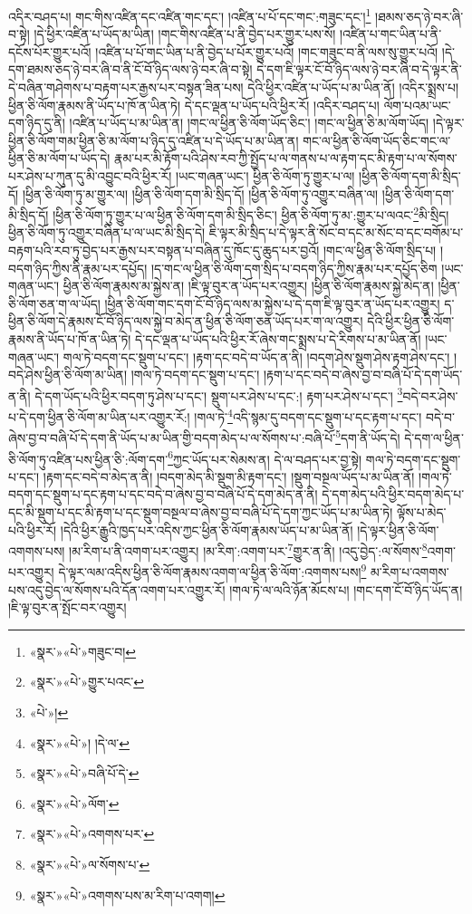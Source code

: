 འདིར་བཤད་པ། གང་གིས་འཛིན་དང་འཛིན་གང་དང་། །འཛིན་པ་པོ་དང་གང་:གཟུང་དང་།\footnote{«སྣར་»«པེ་»གཟུང་བ།} །ཐམས་ཅད་ཉེ་བར་ཞི་བ་སྟེ། །དེ་ཕྱིར་འཛིན་པ་ཡོད་མ་ཡིན། །གང་གིས་འཛིན་པ་ནི་བྱེད་པར་གྱུར་པས་སོ། །འཛིན་པ་གང་ཡིན་པ་ནི་དངོས་པོར་གྱུར་པའོ། །འཛིན་པ་པོ་གང་ཡིན་པ་ནི་བྱེད་པ་པོར་གྱུར་པའོ། །གང་གཟུང་བ་ནི་ལས་སུ་གྱུར་པའོ། །དེ་དག་ཐམས་ཅད་ཉེ་བར་ཞི་བ་ནི་ངོ་བོ་ཉིད་ལས་ཉེ་བར་ཞི་བ་སྟེ། དེ་དག་ཇི་ལྟར་ངོ་བོ་ཉིད་ལས་ཉེ་བར་ཞི་བ་དེ་ལྟར་ནི་དེ་བཞིན་གཤེགས་པ་བརྟག་པར་རྒྱས་པར་བསྟན་ཟིན་པས། དེའི་ཕྱིར་འཛིན་པ་ཡོད་པ་མ་ཡིན་ནོ། །འདིར་སྨྲས་པ། ཕྱིན་ཅི་ལོག་རྣམས་ནི་ཡོད་པ་ཁོ་ན་ཡིན་ཏེ། དེ་དང་ལྡན་པ་ཡོད་པའི་ཕྱིར་རོ། །འདིར་བཤད་པ། ལོག་པའམ་ཡང་དག་ཉིད་དུ་ནི། །འཛིན་པ་ཡོད་པ་མ་ཡིན་ན། །གང་ལ་ཕྱིན་ཅི་ལོག་ཡོད་ཅིང་། །གང་ལ་ཕྱིན་ཅི་མ་ལོག་ཡོད། །དེ་ལྟར་ཕྱིན་ཅི་ལོག་གམ་ཕྱིན་ཅི་མ་ལོག་པ་ཉིད་དུ་འཛིན་པ་དེ་ཡོད་པ་མ་ཡིན་ན། གང་ལ་ཕྱིན་ཅི་ལོག་ཡོད་ཅིང་གང་ལ་ཕྱིན་ཅི་མ་ལོག་པ་ཡོད་དེ། རྣམ་པར་མི་རྟོག་པའི་ཤེས་རབ་ཀྱི་སྤྱོད་པ་ལ་གནས་པ་ལ་རྟག་དང་མི་རྟག་པ་ལ་སོགས་པར་ཤེས་པ་ཀུན་དུ་མི་འབྱུང་བའི་ཕྱིར་རོ། །ཡང་གཞན་ཡང་། ཕྱིན་ཅི་ལོག་ཏུ་གྱུར་པ་ལ། །ཕྱིན་ཅི་ལོག་དག་མི་སྲིད་དོ། །ཕྱིན་ཅི་ལོག་ཏུ་མ་གྱུར་ལ། །ཕྱིན་ཅི་ལོག་དག་མི་སྲིད་དོ། །ཕྱིན་ཅི་ལོག་ཏུ་འགྱུར་བཞིན་ལ། །ཕྱིན་ཅི་ལོག་དག་མི་སྲིད་དོ། །ཕྱིན་ཅི་ལོག་ཏུ་གྱུར་པ་ལ་ཕྱིན་ཅི་ལོག་དག་མི་སྲིད་ཅིང་། ཕྱིན་ཅི་ལོག་ཏུ་མ་:གྱུར་པ་ལའང་\footnote{«སྣར་»«པེ་»གྱུར་པའང་}མི་སྲིད། ཕྱིན་ཅི་ལོག་ཏུ་འགྱུར་བཞིན་པ་ལ་ཡང་མི་སྲིད་དེ། ཇི་ལྟར་མི་སྲིད་པ་དེ་ལྟར་ནི་སོང་བ་དང་མ་སོང་བ་དང་བགོམ་པ་བརྟག་པའི་རབ་ཏུ་བྱེད་པར་རྒྱས་པར་བསྟན་པ་བཞིན་དུ་ཁོང་དུ་ཆུད་པར་བྱའོ། །གང་ལ་ཕྱིན་ཅི་ལོག་སྲིད་པ། །བདག་ཉིད་ཀྱིས་ནི་རྣམ་པར་དཔྱོད། །ད་གང་ལ་ཕྱིན་ཅི་ལོག་དག་སྲིད་པ་བདག་ཉིད་ཀྱིས་རྣམ་པར་དཔྱོད་ཅིག །ཡང་གཞན་ཡང་། ཕྱིན་ཅི་ལོག་རྣམས་མ་སྐྱེས་ན། །ཇི་ལྟ་བུར་ན་ཡོད་པར་འགྱུར། །ཕྱིན་ཅི་ལོག་རྣམས་སྐྱེ་མེད་ན། །ཕྱིན་ཅི་ལོག་ཅན་ག་ལ་ཡོད། །ཕྱིན་ཅི་ལོག་གང་དག་ངོ་བོ་ཉིད་ལས་མ་སྐྱེས་པ་དེ་དག་ཇི་ལྟ་བུར་ན་ཡོད་པར་འགྱུར། ད་ཕྱིན་ཅི་ལོག་དེ་རྣམས་ངོ་བོ་ཉིད་ལས་སྐྱེ་བ་མེད་ན་ཕྱིན་ཅི་ལོག་ཅན་ཡོད་པར་ག་ལ་འགྱུར། དེའི་ཕྱིར་ཕྱིན་ཅི་ལོག་རྣམས་ནི་ཡོད་པ་ཁོ་ན་ཡིན་ཏེ། དེ་དང་ལྡན་པ་ཡོད་པའི་ཕྱིར་རོ་ཞེས་གང་སྨྲས་པ་དེ་རིགས་པ་མ་ཡིན་ནོ། །ཡང་གཞན་ཡང་། གལ་ཏེ་བདག་དང་སྡུག་པ་དང་། །རྟག་དང་བདེ་བ་ཡོད་ན་ནི། །བདག་ཤེས་སྡུག་ཤེས་རྟག་ཤེས་དང་། །བདེ་ཤེས་ཕྱིན་ཅི་ལོག་མ་ཡིན། །གལ་ཏེ་བདག་དང་སྡུག་པ་དང་། །རྟག་པ་དང་བདེ་བ་ཞེས་བྱ་བ་བཞི་པོ་དེ་དག་ཡོད་ན་ནི། དེ་དག་ཡོད་པའི་ཕྱིར་བདག་ཏུ་ཤེས་པ་དང་། སྡུག་པར་ཤེས་པ་དང་:། རྟག་པར་ཤེས་པ་དང་། \footnote{«པེ་»།  }བདེ་བར་ཤེས་པ་དེ་དག་ཕྱིན་ཅི་ལོག་མ་ཡིན་པར་འགྱུར་རོ:། །གལ་ཏེ་\footnote{«སྣར་»«པེ་»། །དེ་ལ་}འདི་སྙམ་དུ་བདག་དང་སྡུག་པ་དང་རྟག་པ་དང་། བདེ་བ་ཞེས་བྱ་བ་བཞི་པོ་དེ་དག་ནི་ཡོད་པ་མ་ཡིན་གྱི་བདག་མེད་པ་ལ་སོགས་པ་:བཞི་པོ་\footnote{«སྣར་»«པེ་»བཞི་པོ་དེ་}དག་ནི་ཡོད་དེ། དེ་དག་ལ་ཕྱིན་ཅི་ལོག་ཏུ་འཛིན་པས་ཕྱིན་ཅི་:ལོག་དག་\footnote{«སྣར་»«པེ་»ལོག་}ཀྱང་ཡོད་པར་སེམས་ན། དེ་ལ་བཤད་པར་བྱ་སྟེ། གལ་ཏེ་བདག་དང་སྡུག་པ་དང་། །རྟག་དང་བདེ་བ་མེད་ན་ནི། །བདག་མེད་མི་སྡུག་མི་རྟག་དང་། །སྡུག་བསྔལ་ཡོད་པ་མ་ཡིན་ནོ། །གལ་ཏེ་བདག་དང་སྡུག་པ་དང་རྟག་པ་དང་བདེ་བ་ཞེས་བྱ་བ་བཞི་པོ་དེ་དག་མེད་ན་ནི། དེ་དག་མེད་པའི་ཕྱིར་བདག་མེད་པ་དང་མི་སྡུག་པ་དང་མི་རྟག་པ་དང་སྡུག་བསྔལ་བ་ཞེས་བྱ་བ་བཞི་པོ་དེ་དག་ཀྱང་ཡོད་པ་མ་ཡིན་ཏེ། ལྟོས་པ་མེད་པའི་ཕྱིར་རོ། །དེའི་ཕྱིར་རྒྱུའི་ཁྱད་པར་འདིས་ཀྱང་ཕྱིན་ཅི་ལོག་རྣམས་ཡོད་པ་མ་ཡིན་ནོ། །དེ་ལྟར་ཕྱིན་ཅི་ལོག་འགགས་པས། །མ་རིག་པ་ནི་འགག་པར་འགྱུར། །མ་རིག་:འགག་པར་\footnote{«སྣར་»«པེ་»འགགས་པར་}གྱུར་ན་ནི། །འདུ་བྱེད་:ལ་སོགས་\footnote{«སྣར་»«པེ་»ལ་སོགས་པ་}འགག་པར་འགྱུར། དེ་ལྟར་ལམ་འདིས་ཕྱིན་ཅི་ལོག་རྣམས་འགག་ལ་ཕྱིན་ཅི་ལོག་:འགགས་པས།\footnote{«སྣར་»«པེ་»འགགས་པས་མ་རིག་པ་འགག།} མ་རིག་པ་འགགས་པས་འདུ་བྱེད་ལ་སོགས་པའི་དོན་འགག་པར་འགྱུར་རོ། །གལ་ཏེ་ལ་ལའི་ཉོན་མོངས་པ། །གང་དག་ངོ་བོ་ཉིད་ཡོད་ན། །ཇི་ལྟ་བུར་ན་སྤོང་བར་འགྱུར། 